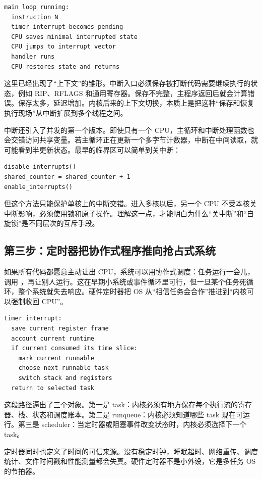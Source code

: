 \begin{lstlisting}
main loop running:
  instruction N
  timer interrupt becomes pending
  CPU saves minimal interrupted state
  CPU jumps to interrupt vector
  handler runs
  CPU restores state and returns
\end{lstlisting}

这里已经出现了“上下文”的雏形。中断入口必须保存被打断代码需要继续执行的状态，例如 RIP、RFLAGS 和通用寄存器。保存不完整，主程序返回后就会计算错误。保存太多，延迟增加。内核后来的上下文切换，本质上是把这种“保存和恢复执行现场”从中断扩展到多个线程之间。

中断还引入了并发的第一个版本。即使只有一个 CPU，主循环和中断处理函数也会交错访问共享变量。若主循环正在更新一个多字节计数器，中断在中间读取，就可能看到半更新状态。最早的临界区可以简单到关中断：

\begin{lstlisting}
disable_interrupts()
shared_counter = shared_counter + 1
enable_interrupts()
\end{lstlisting}

但这个方法只能保护单核上的中断交错。进入多核以后，另一个 CPU 不受本核关中断影响，必须使用锁和原子操作。理解这一点，才能明白为什么“关中断”和“自旋锁”是不同层次的互斥手段。

\subsection{第三步：定时器把协作式程序推向抢占式系统}

如果所有代码都愿意主动让出 CPU，系统可以用协作式调度：任务运行一会儿，调用 ，再让别人运行。这在早期小系统或事件循环里可行，但一旦某个任务死循环，整个系统就失去响应。硬件定时器把 OS 从“相信任务会合作”推进到“内核可以强制收回 CPU”。

\begin{lstlisting}
timer interrupt:
  save current register frame
  account current runtime
  if current consumed its time slice:
    mark current runnable
    choose next runnable task
    switch stack and registers
  return to selected task
\end{lstlisting}

这段路径逼出了三个对象。第一是 task：内核必须有地方保存每个执行流的寄存器、栈、状态和调度账本。第二是 runqueue：内核必须知道哪些 task 现在可运行。第三是 scheduler：当定时器或阻塞事件改变状态时，内核必须选择下一个 task。

定时器同时也定义了时间的可信来源。没有稳定时钟，睡眠超时、网络重传、调度统计、文件时间戳和性能测量都会失真。硬件定时器不是小外设，它是多任务 OS 的节拍器。


